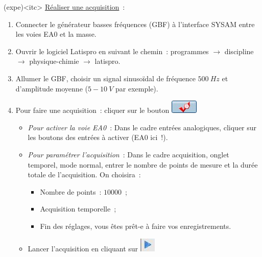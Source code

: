 \documentclass[../main/main.tex]{subfiles}
\begin{document}
\begin{tcb}[breakable](expe)<itc>{}
	\underline{Réaliser une acquisition}~:
	\begin{enumerate}
		\item Connecter le générateur basses fréquences (GBF) à l'interface SYSAM
		      entre les voies EA0 et la masse.
		\item Ouvrir le logiciel Latispro en suivant le chemin~: programmes
		      $\rightarrow$ discipline $\rightarrow$ physique-chimie $\rightarrow$
		      latispro.
		\item Allumer le GBF, choisir un signal sinusoïdal de fréquence
		      $\SI{500}{Hz}$ et d'amplitude moyenne ($5-\SI{10}{V}$ par exemple).
		\item Pour faire une acquisition~: cliquer sur le bouton
		      \includegraphics[height=.5cm]{bouton_acq}
		      \begin{itemize}
			      \item \textit{Pour activer la voie EA0}~: Dans le cadre entrées
			            analogiques, cliquer sur les boutons des entrées à activer (EA0
			            ici~!).
			      \item \textit{Pour paramétrer l'acquisition}~: Dans le cadre
			            acquisition, onglet temporel, mode normal, entrer le nombre de
			            points de mesure et la durée totale de l'acquisition. On
			            choisira~:
			            \begin{itemize}
				            \item Nombre de points~: $\num{10 000}$~;
				            \item Acquisition temporelle~;
			            \end{itemize}
			            \begin{itemize}
				            \item Fin des réglages, vous êtes prêt-e à faire vos
				                  enregistrements.
			            \end{itemize}
			      \item Lancer l'acquisition en cliquant sur
			            \includegraphics[height=.5cm]{bouton_lancer}
		      \end{itemize}
	\end{enumerate} \bigbreak


\end{tcb}
\end{document}
